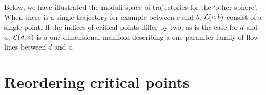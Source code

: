 \begin{eg}
    Below, we have illustrated the moduli space of trajectories for the `other sphere'.
    When there is a single trajectory for example between $c$ and  $b$, $\mathcal L(c, b)$ consist of a single point.
    If the indices of critical points differ by two, as is the case for $d$ and  $a$,  $\mathcal L(d, a)$ is a one-dimensional manifold describing a one-paramter family of flow lines between  $d$ and  $a$.
\end{eg}
\begin{figure}[H]
    \centering
\end{figure}





\filbreak
\section{Reordering critical points}
\mbox{}\\[-3em]

